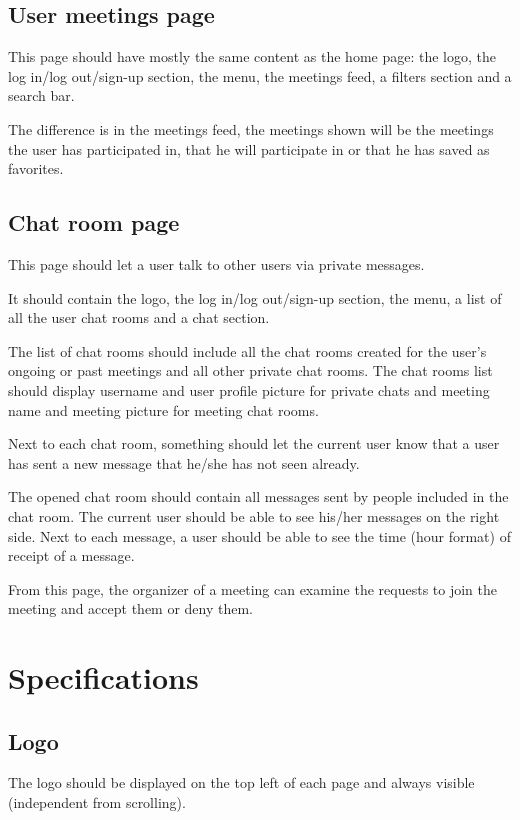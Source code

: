 \documentclass[conference]{IEEEtran}
\begin{document}
\subsection{User meetings page}

This page should have mostly the same content as the home page: the logo, the log in/log out/sign-up section, the menu, the meetings feed, a filters section and a search bar.

The difference is in the meetings feed, the meetings shown will be the meetings the user has participated in, that he will participate in or that he has saved as favorites.

\subsection{Chat room page}

This page should let a user talk to other users via private messages.

It should contain the logo, the log in/log out/sign-up section, the menu, a list of all the user chat rooms and a chat section.

The list of chat rooms should include all the chat rooms created for the user's ongoing or past meetings and all other private chat rooms.
The chat rooms list should display username and user profile picture for private chats and meeting name and meeting picture for meeting chat rooms.

Next to each chat room, something should let the current user know that a user has sent a new message that he/she has not seen already.

The opened chat room should contain all messages sent by people included in the chat room.
The current user should be able to see his/her messages on the right side.
Next to each message, a user should be able to see the time (hour format) of receipt of a message.

From this page, the organizer of a meeting can examine the requests to join the meeting and accept them or deny them.

\section{Specifications}

\subsection{Logo}

The logo should be displayed on the top left of each page and always visible (independent from scrolling).
\end{document}
